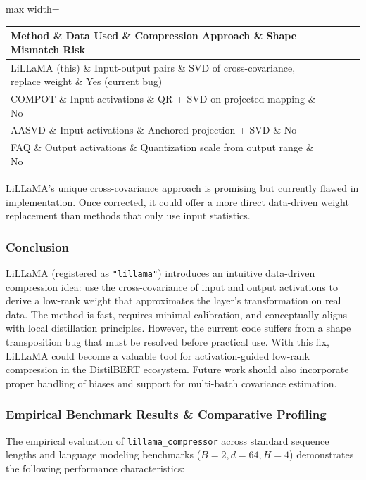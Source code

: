 \begin{center}
\begin{adjustbox}{max width=\columnwidth}
\renewcommand{\arraystretch}{1.2}
\begin{tabular}{llll}
\toprule
Method \& Data Used \& Compression Approach \& Shape Mismatch Risk \\
\midrule
LiLLaMA (this) \& Input-output pairs \& SVD of cross-covariance, replace weight \& Yes (current bug) \\
COMPOT \& Input activations \& QR + SVD on projected mapping \& No \\
AASVD \& Input activations \& Anchored projection + SVD \& No \\
FAQ \& Output activations \& Quantization scale from output range \& No \\

\bottomrule
\end{tabular}
\end{adjustbox}
\end{center}
LiLLaMA's unique cross-covariance approach is promising but currently flawed in implementation. Once corrected, it could offer a more direct data-driven weight replacement than methods that only use input statistics.


\subsubsection*{Conclusion}

LiLLaMA (registered as \texttt{"lillama"}) introduces an intuitive data-driven compression idea: use the cross-covariance of input and output activations to derive a low-rank weight that approximates the layer's transformation on real data. The method is fast, requires minimal calibration, and conceptually aligns with local distillation principles. However, the current code suffers from a shape transposition bug that must be resolved before practical use. With this fix, LiLLaMA could become a valuable tool for activation-guided low-rank compression in the DistilBERT ecosystem. Future work should also incorporate proper handling of biases and support for multi-batch covariance estimation.

\subsubsection*{Empirical Benchmark Results \& Comparative Profiling}

The empirical evaluation of \texttt{lillama\_compressor} across standard sequence lengths and language modeling benchmarks ($B=2, d=64, H=4$) demonstrates the following performance characteristics:

